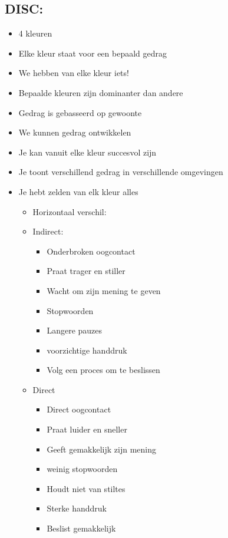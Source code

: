 \documentclass[12pt]{article}
\begin{document}
\subsection{DISC:}
\begin{itemize}
    \item 4 kleuren
    \item Elke kleur staat voor een bepaald gedrag
    \item We hebben van elke kleur iets!
    \item Bepaalde kleuren zijn dominanter dan andere
    \item Gedrag is gebasseerd op gewoonte
    \item We kunnen gedrag ontwikkelen 
    \item Je kan vanuit elke kleur succesvol zijn
    \item Je toont verschillend gedrag in verschillende omgevingen 
    \item Je hebt zelden van elk kleur alles\begin{itemize}
        \item[]Horizontaal verschil:
        \item Indirect:\begin{itemize}
            \item Onderbroken oogcontact
            \item Praat trager en stiller
            \item Wacht om zijn mening te geven
            \item Stopwoorden
            \item Langere pauzes
            \item voorzichtige handdruk
            \item Volg een proces om te beslissen
        \end{itemize}
        \item Direct\begin{itemize}
            \item Direct oogcontact
            \item Praat luider en sneller
            \item Geeft gemakkelijk zijn mening 
            \item weinig stopwoorden 
            \item Houdt niet van stiltes 
            \item Sterke handdruk 
            \item Beslist gemakkelijk
        \end{itemize}

\end{itemize}
\end{itemize}
\end{document}
